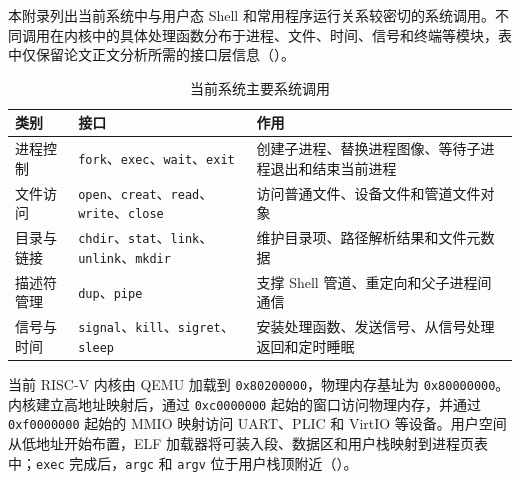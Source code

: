 \label{sec:appendix-syscalls}

本附录列出当前系统中与用户态 Shell 和常用程序运行关系较密切的系统调用。不同调用在内核中的具体处理函数分布于进程、文件、时间、信号和终端等模块，表中仅保留论文正文分析所需的接口层信息（）。

\begin{table}[htbp]
  \caption{当前系统主要系统调用}\label{tab:appendix-syscalls}
  \centering
  \begin{tabular}{p{}p{}p{}}
    \toprule
    \textbf{类别} & \textbf{接口} & \textbf{作用} \\
    \midrule
    进程控制 & \verb|fork|、\verb|exec|、\verb|wait|、\verb|exit| & 创建子进程、替换进程图像、等待子进程退出和结束当前进程 \\
    文件访问 & \verb|open|、\verb|creat|、\verb|read|、\verb|write|、\verb|close| & 访问普通文件、设备文件和管道文件对象 \\
    目录与链接 & \verb|chdir|、\verb|stat|、\verb|link|、\verb|unlink|、\verb|mkdir| & 维护目录项、路径解析结果和文件元数据 \\
    描述符管理 & \verb|dup|、\verb|pipe| & 支撑 Shell 管道、重定向和父子进程间通信 \\
    信号与时间 & \verb|signal|、\verb|kill|、\verb|sigret|、\verb|sleep| & 安装处理函数、发送信号、从信号处理返回和定时睡眠 \\
    \bottomrule
  \end{tabular}
\end{table}

\label{sec:appendix-layout}

当前 RISC-V 内核由 QEMU 加载到 \verb|0x80200000|，物理内存基址为 \verb|0x80000000|。内核建立高地址映射后，通过 \verb|0xc0000000| 起始的窗口访问物理内存，并通过 \verb|0xf0000000| 起始的 MMIO 映射访问 UART、PLIC 和 VirtIO 等设备。用户空间从低地址开始布置，ELF 加载器将可装入段、数据区和用户栈映射到进程页表中；\verb|exec| 完成后，\verb|argc| 和 \verb|argv| 位于用户栈顶附近（）。

